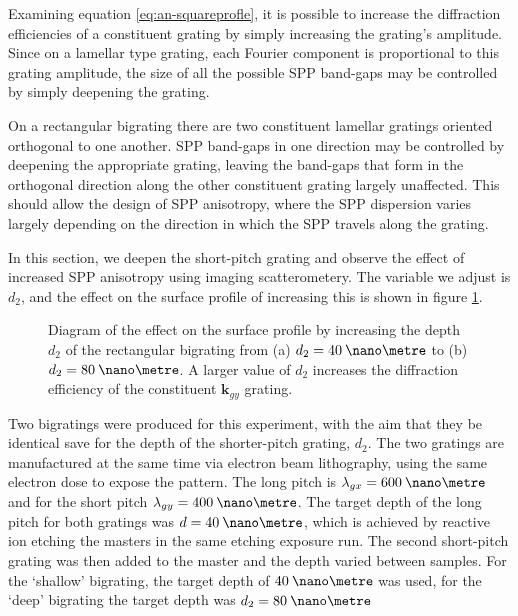 Examining equation \ref{eq:an-squareprofle}, it is possible to increase the diffraction efficiencies of a constituent grating by simply increasing the grating's amplitude. Since on a lamellar type grating, each Fourier component is proportional to this grating amplitude, the size of all the possible SPP band-gaps may be controlled by simply deepening the grating.

On a rectangular bigrating there are two constituent lamellar gratings oriented orthogonal to one another. SPP band-gaps in one direction may be controlled by deepening the appropriate grating, leaving the band-gaps that form in the orthogonal direction along the other constituent grating largely unaffected. This should allow the design of SPP anisotropy, where the SPP dispersion varies largely depending on the direction in which the SPP travels along the grating.

In this section, we deepen the short-pitch grating and observe the effect of increased SPP anisotropy using imaging scatterometery. The variable we adjust is $d_2$, and the effect on the surface profile of increasing this is shown in figure \ref{fig:deepingingIt}.

\begin{figure}
\begin{center}
\end{center}
\caption[Diagram of the effect on the surface profile by increasing the depth $d_2$ of the rectangular bigrating.]{Diagram of the effect on the surface profile by increasing the depth $d_2$ of the rectangular bigrating from (a) $d_2=40\:\nano\metre$ to (b) $d_2=80\:\nano\metre$. A larger value of $d_2$ increases the diffraction efficiency of the constituent $\mathbf{k}_{gy}$ grating.\label{fig:deepingingIt}}
\end{figure}

Two bigratings were produced for this experiment, with the aim that they be identical save for the depth of the shorter-pitch grating, $d_2$. The two gratings are manufactured at the same time via electron beam lithography, using the same electron dose to expose the pattern. The long pitch is $\lambda_{gx}=600\:\nano\metre$ and for the short pitch $\lambda_{gy}=400\:\nano\metre$. The target depth of the long pitch for both gratings was $d=40\:\nano\metre$, which is achieved by reactive ion etching the masters in the same etching exposure run. The second short-pitch grating was then added to the master and the depth varied between samples. For the `shallow' bigrating, the target depth of $40 \:\nano\metre$ was used, for the `deep' bigrating the target depth was $d_2=80\:\nano\metre$ 


